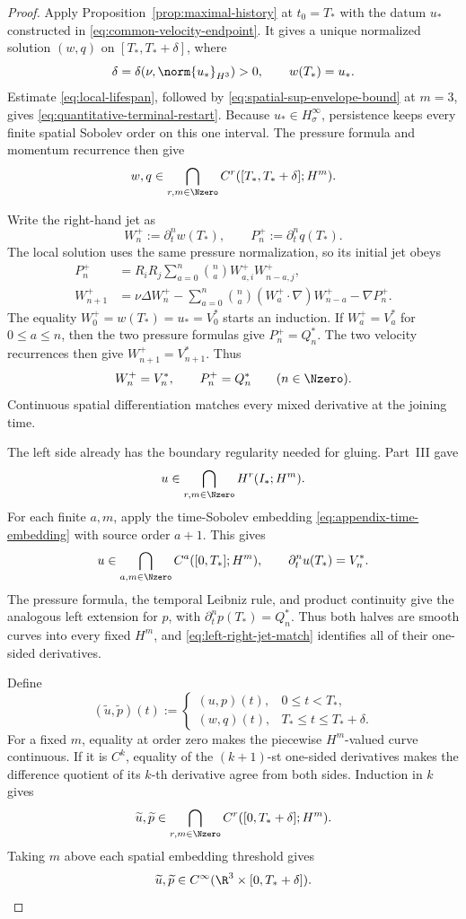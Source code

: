 \begin{proof}
Apply Proposition~\ref{prop:maximal-history} at \(t_0=T_*\) with the datum
\(u_*\) constructed in \eqref{eq:common-velocity-endpoint}.  It gives a
unique normalized solution \((w,q)\) on
\([T_*,T_*+\delta]\), where
 \[
  \delta=\delta(\nu,\norm{u_*}_{H^3})>0,
  \qquad w(T_*)=u_*.
 \]
Estimate \eqref{eq:local-lifespan}, followed by
\eqref{eq:spatial-sup-envelope-bound} at \(m=3\), gives
\eqref{eq:quantitative-terminal-restart}.
Because \(u_*\in H^\infty_\sigma\), persistence keeps every finite spatial
Sobolev order on this one interval.  The pressure formula and momentum
recurrence then give
\[
 w,q\in\bigcap_{r,m\in\Nzero}
 C^r([T_*,T_*+\delta];H^m).
\]

Write the right-hand jet as
\[
 W_n^+:=\partial_t^nw(T_*),
 \qquad
 P_n^+:=\partial_t^nq(T_*).
\]
The local solution uses the same pressure normalization, so its initial jet
obeys
\begin{align*}
 P_n^+
 &=R_iR_j\sum_{a=0}^{n}\binom naW_{a,i}^+W_{n-a,j}^+,\\
 W_{n+1}^+
 &=\nu\Delta W_n^+
 -\sum_{a=0}^{n}\binom na(W_a^+\cdot\nabla)W_{n-a}^+
 -\nabla P_n^+.
\end{align*}
The equality \(W_0^+=w(T_*)=u_*=V_0^*\) starts an induction.  If
\(W_a^+=V_a^*\) for \(0\le a\le n\), then the two pressure formulas give
\(P_n^+=Q_n^*\).  The two velocity recurrences then give
\(W_{n+1}^+=V_{n+1}^*\).  Thus
\begin{equation}
 W_n^+=V_n^*,
 \qquad
 P_n^+=Q_n^*
 \qquad(n\in\Nzero).
 \label{eq:left-right-jet-match}
\end{equation}
Continuous spatial differentiation matches every mixed derivative at the
joining time.

The left side already has the boundary regularity needed for gluing.  Part~III
gave
\[
 u\in\bigcap_{r,m\in\Nzero}H^r(I_*;H^m).
\]
For each finite \(a,m\), apply the time-Sobolev embedding
\eqref{eq:appendix-time-embedding} with source order \(a+1\).  This gives
\[
 u\in\bigcap_{a,m\in\Nzero}C^a([0,T_*];H^m),
 \qquad \partial_t^nu(T_*)=V_n^*.
\]
The pressure formula, the temporal Leibniz rule, and product continuity give
the analogous left extension for \(p\), with
\(\partial_t^np(T_*)=Q_n^*\).  Thus both halves are smooth curves into every
fixed \(H^m\), and \eqref{eq:left-right-jet-match} identifies all of their
one-sided derivatives.

Define
\[
 (\widetilde u,\widetilde p)(t)
 :=
 \begin{cases}
  (u,p)(t),&0\le t<T_*,\\
  (w,q)(t),&T_*\le t\le T_*+\delta.
 \end{cases}
\]
For a fixed \(m\), equality at order zero makes the piecewise \(H^m\)-valued
curve continuous.  If it is \(C^k\), equality of the \((k+1)\)-st one-sided
derivatives makes the difference quotient of its \(k\)-th derivative agree
from both sides.  Induction in \(k\) gives
\[
 \widetilde u,\widetilde p
 \in\bigcap_{r,m\in\Nzero}C^r([0,T_*+\delta];H^m).
\]
Taking \(m\) above each spatial embedding threshold gives
\[
 \widetilde u,\widetilde p
 \in C^\infty(\R^3\times[0,T_*+\delta]).
\]


\end{proof}
